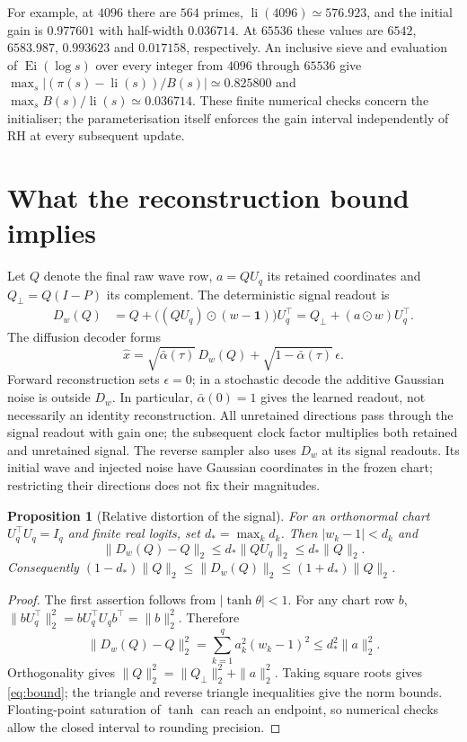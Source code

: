 \documentclass[11pt,a4paper]{article}
\newcommand{\U}{U_q}
\DeclareMathOperator{\li}{li}
\DeclareMathOperator{\Ei}{Ei}
\newtheorem{proposition}{Proposition}
\begin{document}
For example, at $4096$ there are $564$ primes, $\li(4096)\simeq576.923$,
and the initial gain is $0.977601$ with half-width $0.036714$.
At $65536$ these values are $6542$, $6583.987$, $0.993623$ and
$0.017158$, respectively. An inclusive sieve and evaluation of $\Ei(\log s)$
over every integer from $4096$ through $65536$ give
$\max_s |(\pi(s)-\li(s))/B(s)|\simeq0.825800$ and
$\max_s B(s)/\li(s)\simeq0.036714$. These finite numerical checks concern
the initialiser; the parameterisation itself enforces the gain interval
independently of RH at every subsequent update.

\section{What the reconstruction bound implies}
Let $Q$ denote the final raw wave row, $a=Q\U$ its retained coordinates and
$Q_\perp=Q(I-P)$ its complement. The deterministic signal readout is
\begin{align}
 D_w(Q)&=Q+\bigl((Q\U)\odot(w-\mathbf1)\bigr)\U^\top
       =Q_\perp+(a\odot w)\U^\top. \label{eq:readout}
\end{align}
The diffusion decoder forms
\begin{equation}
 \hat x=\sqrt{\bar\alpha(\tau)}\,D_w(Q)
          +\sqrt{1-\bar\alpha(\tau)}\,\epsilon .
 \label{eq:recon}
\end{equation}
Forward reconstruction sets $\epsilon=0$; in a stochastic decode the
additive Gaussian noise is outside $D_w$. In particular, $\bar\alpha(0)=1$ gives
the learned readout, not necessarily an identity reconstruction. All
unretained directions pass through the signal readout with gain one; the
subsequent clock factor multiplies both retained and unretained signal.
The reverse sampler also uses $D_w$ at its signal readouts. Its initial
wave and injected noise have Gaussian coordinates in the frozen chart;
restricting their directions does not fix their magnitudes.

\begin{proposition}[Relative distortion of the signal]
For an orthonormal chart $\U^\top\U=I_q$ and finite real logits, set
$d_*=\max_k d_k$. Then $|w_k-1|<d_k$ and
\begin{equation}
 \|D_w(Q)-Q\|_2\le d_*\|Q\U\|_2\le d_*\|Q\|_2 .
 \label{eq:bound}
\end{equation}
Consequently $(1-d_*)\|Q\|_2\le\|D_w(Q)\|_2\le(1+d_*)\|Q\|_2$.
\end{proposition}
\begin{proof}
The first assertion follows from $|\tanh\theta|<1$. For any chart row $b$,
$\|b\U^\top\|_2^2=b\U^\top\U b^\top=\|b\|_2^2$. Therefore
\[
 \|D_w(Q)-Q\|_2^2=\sum_{k=1}^q a_k^2(w_k-1)^2
       \le d_*^2\|a\|_2^2.
\]
Orthogonality gives $\|Q\|_2^2=\|Q_\perp\|_2^2+\|a\|_2^2$.
Taking square roots gives \eqref{eq:bound}; the triangle and reverse triangle
inequalities give the norm bounds. Floating-point saturation of $\tanh$ can
reach an endpoint, so numerical checks allow the closed interval to rounding
precision.
\end{proof}
\end{document}
